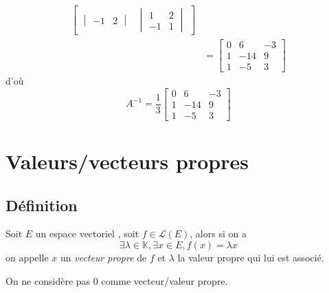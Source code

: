 \documentclass[11pt,colorlinks]{book}
\theoremstyle{mytheoremstyle}
\theoremstyle{mytheoremstyle}
\theoremstyle{mytheoremstyle}
\theoremstyle{mytheoremstyle}
\theoremstyle{mytheoremstyle}
\theoremstyle{mytheoremstyle}
\theoremstyle{mytheoremstyle}
\theoremstyle{mytheoremstyle}
\theoremstyle{myproblemstyle}
\def\mbb#1{\mathbb{#1}}
\def\mfc#1{\mathcal{#1}}
\def\bK{\mbb{K}}
\def\ev{espace vectoriel }
\begin{document}
\begin{ex}
\begin{align*}
\begin{bmatrix}
\begin{vmatrix}
        -1 & 2
      \end{vmatrix}&
      \begin{vmatrix}
        1 & 2 \\ 
        -1 & 1
      \end{vmatrix}
    \end{bmatrix} \\ 
    &= \begin{bmatrix}
      0 & 6 & -3 \\ 
      1 & -14 & 9 \\ 
      1 & -5 & 3
    \end{bmatrix}
  \end{align*}
  d'où 
  \begin{equation*}
    A^{-1} = \frac{1}{3}
    \begin{bmatrix}
      0 & 6 & -3 \\ 
      1 & -14 & 9 \\ 
      1 & -5 & 3
    \end{bmatrix}
  \end{equation*}
\end{ex}


\chapter{Valeurs/vecteurs propres}
\section{Définition}
\begin{definition}
  Soit $E$ un \ev, soit $f \in \mfc{L}(E)$, alors si on a 
  \begin{equation*}
    \exists \lambda \in \bK, \exists x \in E, f(x) = \lambda x
  \end{equation*}
  on appelle $x$ un \textit{vecteur propre} de $f$ et $\lambda$ la valeur propre qui lui est associé.
\end{definition}
\begin{rmq}
  On ne considère pas $0$ comme vecteur/valeur propre. 
\end{rmq}
\end{document}
